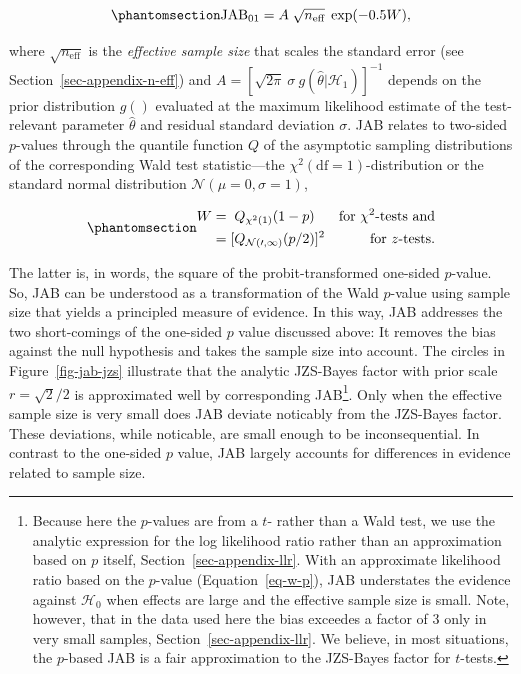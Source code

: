 \documentclass[
  man,
  floatsintext,
  longtable,
  nolmodern,
  notxfonts,
  notimes,
  colorlinks=true,linkcolor=blue,citecolor=blue,urlcolor=blue]{apa7}
\begin{document}
\begin{equation}\phantomsection\label{eq-jab}{
\text{JAB}_{01} = A \; \sqrt{n_\text{eff}} \; \exp(-0.5 W),
}\end{equation}

where \(\sqrt{n_\text{eff}}\) is the \emph{effective sample size} that
scales the standard error (see Section~\ref{sec-appendix-n-eff}) and
\(A = [\sqrt{2 \pi}~\sigma~g(\hat \theta | \mathcal{H}_1)]^{-1}\)
depends on the prior distribution \(g()\) evaluated at the maximum
likelihood estimate of the test-relevant parameter \(\hat \theta\) and
residual standard deviation \(\sigma\). JAB relates to two-sided
\(p\)-values through the quantile function \(Q\) of the asymptotic
sampling distributions of the corresponding Wald test statistic---the
\(\chi^2(\mathrm{df} = 1)\)-distribution or the standard normal
distribution \(\mathcal{N(\mu = 0, \sigma = 1)}\),

\begin{equation}\phantomsection\label{eq-w-p}{
\begin{aligned}
W & = \phantom{[} Q_{\chi^2(1)}(1-p) \phantom{]^2} & \text{for } \chi^2\text{-tests and} \\
  & = [Q_{\mathcal{N(0,1)}}(p/2)]^2 & \text{for } z\text{-tests.}
\end{aligned}
}\end{equation}

The latter is, in words, the square of the probit-transformed one-sided
\(p\)-value. So, JAB can be understood as a transformation of the Wald
\(p\)-value using sample size that yields a principled measure of
evidence. In this way, JAB addresses the two short-comings of the
one-sided \(p\) value discussed above: It removes the bias against the
null hypothesis and takes the sample size into account. The circles in
Figure~\ref{fig-jab-jzs} illustrate that the analytic JZS-Bayes factor
with prior scale \(r = \sqrt{2}/2\) is approximated well by
corresponding JAB\footnote{Because here the \(p\)-values are from a
  \(t\)- rather than a Wald test, we use the analytic expression for the
  log likelihood ratio rather than an approximation based on \(p\)
  itself, Section~\ref{sec-appendix-llr}. With an approximate likelihood
  ratio based on the \(p\)-value (Equation~\ref{eq-w-p}), JAB
  understates the evidence against \(\mathcal{H}_0\) when effects are
  large and the effective sample size is small. Note, however, that in
  the data used here the bias exceedes a factor of 3 only in very small
  samples, Section~\ref{sec-appendix-llr}. We believe, in most
  situations, the \(p\)-based JAB is a fair approximation to the
  JZS-Bayes factor for \(t\)-tests.}. Only when the effective sample
size is very small does JAB deviate noticably from the JZS-Bayes factor.
These deviations, while noticable, are small enough to be
inconsequential. In contrast to the one-sided \(p\) value, JAB largely
accounts for differences in evidence related to sample size.
\end{document}
